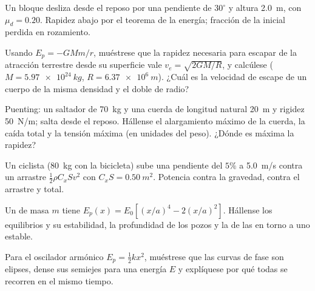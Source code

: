 \begin{exercise}[$\star\star$]\label{exo:b1:work-and-energy:5}
Un bloque desliza desde el reposo por una pendiente de $30^\circ$ y altura
\qty{2.0}{m}, con $\mu_d = 0.20$. Rapidez abajo por el teorema de la
energía; fracción de la  inicial perdida en rozamiento.
\end{exercise}

\begin{exercise}[$\star\star$]\label{exo:b1:work-and-energy:6}
Usando $E_p = -GMm/r$, muéstrese que la rapidez necesaria para escapar de
la atracción terrestre desde su superficie vale $v_e = \sqrt{2GM/R}$, y
calcúlese ($M = \qty{5.97e24}{kg}$, $R = \qty{6.37e6}{m}$). ¿Cuál es la
velocidad de escape de un cuerpo de la misma densidad y el doble de radio?
\end{exercise}

\begin{exercise}[$\star\star$]\label{exo:b1:work-and-energy:7}
Puenting: un saltador de \qty{70}{kg} y una cuerda de longitud natural
\qty{20}{m} y rigidez \qty{50}{N/m}; salta desde el reposo. Hállense el
alargamiento máximo de la cuerda, la caída total y la tensión máxima (en
unidades del peso). ¿Dónde es máxima la rapidez?
\end{exercise}

\begin{exercise}[$\star\star$]\label{exo:b1:work-and-energy:8}
Un ciclista (\qty{80}{kg} con la bicicleta) sube una pendiente del $5\%$ a
\qty{5.0}{m/s} contra un arrastre $\tfrac12\rho C_xSv^2$ con
$C_xS = \qty{0.50}{m^2}$. Potencia contra la gravedad, contra el arrastre y total.
\end{exercise}

\begin{exercise}[$\star\star$]\label{exo:b1:work-and-energy:9}
Un  de masa $m$ tiene $E_p(x) = E_0[(x/a)^4 - 2(x/a)^2]$.
Hállense los equilibrios y su estabilidad, la profundidad de los pozos y
la  de las  en torno a uno estable.
\end{exercise}

\begin{exercise}[$\star\star\star$]\label{exo:b1:work-and-energy:10}
Para el oscilador armónico $E_p = \tfrac12 kx^2$, muéstrese que las curvas
de fase son elipses, dense sus semiejes para una energía $E$ y explíquese
por qué todas se recorren en el mismo tiempo.
\end{exercise}

